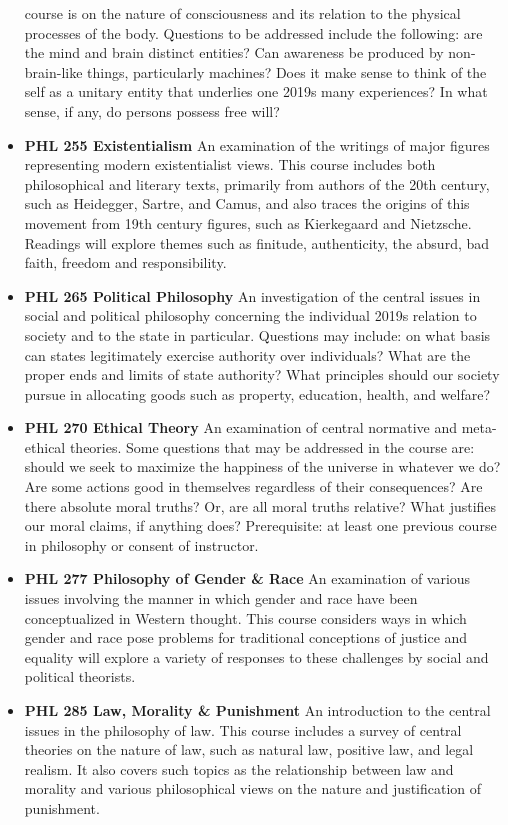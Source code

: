 \documentclass[
  letterpaper,
]{scrbook}
\begin{document}
\begin{itemize}
  course is on the nature of consciousness and its relation to the
  physical processes of the body. Questions to be addressed include the
  following: are the mind and brain distinct entities? Can awareness be
  produced by non-brain-like things, particularly machines? Does it make
  sense to think of the self as a unitary entity that underlies one
  2019s many experiences? In what sense, if any, do persons possess free
  will?
\item
  \textbf{PHL 255 Existentialism} An examination of the writings of
  major figures representing modern existentialist views. This course
  includes both philosophical and literary texts, primarily from authors
  of the 20th century, such as Heidegger, Sartre, and Camus, and also
  traces the origins of this movement from 19th century figures, such as
  Kierkegaard and Nietzsche. Readings will explore themes such as
  finitude, authenticity, the absurd, bad faith, freedom and
  responsibility.
\item
  \textbf{PHL 265 Political Philosophy} An investigation of the central
  issues in social and political philosophy concerning the individual
  2019s relation to society and to the state in particular. Questions
  may include: on what basis can states legitimately exercise authority
  over individuals? What are the proper ends and limits of state
  authority? What principles should our society pursue in allocating
  goods such as property, education, health, and welfare?
\item
  \textbf{PHL 270 Ethical Theory} An examination of central normative
  and meta-ethical theories. Some questions that may be addressed in the
  course are: should we seek to maximize the happiness of the universe
  in whatever we do? Are some actions good in themselves regardless of
  their consequences? Are there absolute moral truths? Or, are all moral
  truths relative? What justifies our moral claims, if anything does?
  Prerequisite: at least one previous course in philosophy or consent of
  instructor.
\item
  \textbf{PHL 277 Philosophy of Gender \& Race} An examination of
  various issues involving the manner in which gender and race have been
  conceptualized in Western thought. This course considers ways in which
  gender and race pose problems for traditional conceptions of justice
  and equality will explore a variety of responses to these challenges
  by social and political theorists.
\item
  \textbf{PHL 285 Law, Morality \& Punishment} An introduction to the
  central issues in the philosophy of law. This course includes a survey
  of central theories on the nature of law, such as natural law,
  positive law, and legal realism. It also covers such topics as the
  relationship between law and morality and various philosophical views
  on the nature and justification of punishment.
\end{itemize}
\end{document}
